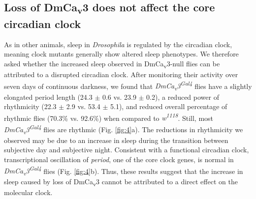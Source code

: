 \subsection*{Loss of DmCa\textsubscript{v}3 does not affect the core circadian clock}

As in other animals, sleep in \emph{Drosophila} is regulated by the circadian clock, meaning clock mutants generally show altered sleep phenotypes\cite{hendricks:2003aa, parisky:2008aa}.
We therefore asked whether the increased sleep observed in DmCa\textsubscript{v}3-null flies can be attributed to a disrupted circadian clock.
After monitoring their activity over seven days of continuous darkness, we found that \emph{DmCa\textsubscript{v}3\textsuperscript{Gal4}} flies have a slightly elongated period length (24.3 $\pm$ 0.6 vs. 23.9 $\pm$ 0.2), a reduced power of rhythmicity (22.3 $\pm$ 2.9 vs. 53.4 $\pm$ 5.1), and reduced overall percentage of rhythmic flies (70.3\% vs. 92.6\%) when compared to \emph{w\textsuperscript{1118}}.
Still, most \emph{DmCa\textsubscript{v}3\textsuperscript{Gal4}} flies are rhythmic (Fig. \ref{fig:4}a).
The reductions in rhythmicity we observed may be due to an increase in sleep during the transition between subjective day and subjective night.
Consistent with a functional circadian clock, transcriptional oscillation of \emph{period}, one of the core clock genes, is normal in \emph{DmCa\textsubscript{v}3\textsuperscript{Gal4}} flies (Fig. \ref{fig:4}b).
Thus, these results suggest that the increase in sleep caused by loss of DmCa\textsubscript{v}3 cannot be attributed to a direct effect on the molecular clock.
